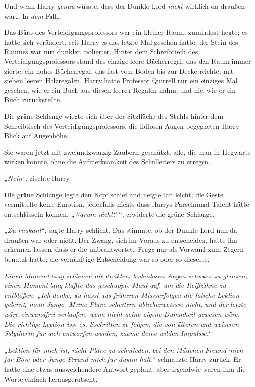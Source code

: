 {Und wenn Harry \emph{genau} wüsste, dass der Dunkle Lord \emph{nicht} wirklich da draußen war… In \emph{dem} Fall…

Das Büro des Verteidigungsprofessors war ein kleiner Raum, zumindest heute; es hatte sich verändert, seit Harry es das letzte Mal gesehen hatte, der Stein des Raumes war nun dunkler, polierter. Hinter dem Schreibtisch des Verteidigungsprofessors stand das einzige leere Bücherregal, das den Raum immer zierte, ein hohes Bücherregal, das fast vom Boden bis zur Decke reichte, mit sieben leeren Holzregalen. Harry hatte Professor Quirrell nur ein einziges Mal gesehen, wie er ein Buch aus diesen leeren Regalen nahm, und nie, wie er ein Buch zurückstellte.

Die grüne Schlange wiegte sich über der Sitzfläche des Stuhls hinter dem Schreibtisch des Verteidigungsprofessors, die lidlosen Augen begegneten Harry Blick auf Augenhöhe.

Sie waren jetzt mit zweiundzwanzig Zaubern geschützt, alle, die man in Hogwarts wirken konnte, ohne die Aufmerksamkeit des Schulleiters zu erregen.

\emph{„Nein“,} zischte Harry.

Die grüne Schlange legte den Kopf schief und neigte ihn leicht; die Geste vermittelte keine Emotion, jedenfalls nichts dass Harrys Parselmund-Talent hätte entschlüsseln können. \emph{„Warum nicht?} “, erwiderte die grüne Schlange.

„\emph{Zu} \emph{risskant}“, sagte Harry schlicht. Das stimmte, ob der Dunkle Lord nun da draußen war oder nicht. Der Zwang, sich im Voraus zu entscheiden, hatte ihn erkennen lassen, dass er die unbeantwortete Frage nur als Vorwand zum Zögern benutzt hatte; die vernünftige Entscheidung war so oder so dieselbe.

\emph{Einen Moment lang schienen die dunklen, bodenlosen Augen schwarz zu glänzen, einen Moment lang klaffte das geschuppte Maul auf, um die Reißzähne zu entblößen. „\emph{Ich denke, du} \emph{hasst} \emph{aus früheren} \emph{Missserfolgen} \emph{die} \emph{falsche Lektion gelernt, mein Junge. Meine Pläne} \emph{scheitern} \emph{üblicherweissse} \emph{nicht, und der letzte wäre einwandfrei verlaufen, wenn nicht deine eigene Dummheit gewesen wäre. Die richtige Lektion isst es,} \emph{Sschritten} \emph{zu folgen, die von älteren und weiseren} \emph{Sslytherin} \emph{für dich entworfen wurden,} \emph{zähme} \emph{deine wilden} \emph{Impulsse}.}“

„\emph{Lektion für mich ist,} \emph{nicht Pläne zu schmieden, bei den Mädchen-Freund mich für Böse oder Junge-Freund mich für dumm hält.}“ schnauzte Harry zurück. Er hatte eine etwas ausweichendere Antwort geplant, aber irgendwie waren ihm die Worte einfach herausgerutscht.

}
